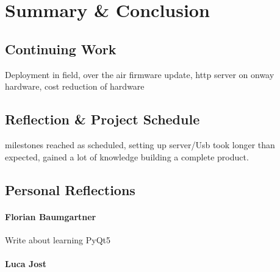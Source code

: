 \chapter{Summary \& Conclusion}

\section{Continuing Work}
Deployment in field, over the air firmware update, http server on onway hardware, cost reduction of hardware

\section{Reflection \& Project Schedule}
milestones reached as scheduled, setting up server/Usb took longer than expected, gained a lot of knowledge building a complete product.  

\section{Personal Reflections}

\subsubsection{Florian Baumgartner}
Write about learning PyQt5

\subsubsection{Luca Jost}